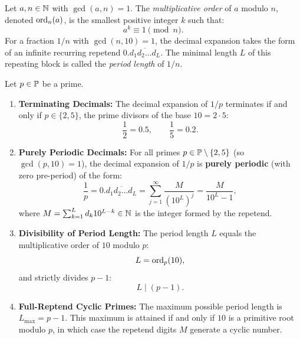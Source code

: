 \begin{definition}
\label{def:ord10}
\leanok
Let $a, n \in \mathbb{N}$ with $\gcd(a, n) = 1$. The \emph{multiplicative order} of $a$ modulo $n$, denoted $\operatorname{ord}_n(a)$, is the smallest positive integer $k$ such that:
\begin{equation}
a^k \equiv 1 \pmod n.
\end{equation}
For a fraction $1/n$ with $\gcd(n, 10) = 1$, the decimal expansion takes the form of an infinite recurring repetend $0.\overline{d_1 d_2 \dots d_L}$. The minimal length $L$ of this repeating block is called the \emph{period length} of $1/n$.
\end{definition}

\begin{theorem}
\label{thm:radix_periodicity}
\leanok
Let $p \in \mathbb{P}$ be a prime.
\begin{enumerate}[label=(\alph*)]
  \item \textbf{Terminating Decimals:} The decimal expansion of $1/p$ terminates if and only if $p \in \{2, 5\}$, the prime divisors of the base $10 = 2 \cdot 5$:
  \begin{equation}
  \frac{1}{2} = 0.5, \qquad \frac{1}{5} = 0.2.
  \end{equation}
  \item \textbf{Purely Periodic Decimals:} For all primes $p \in \mathbb{P} \setminus \{2, 5\}$ (so $\gcd(p, 10) = 1$), the decimal expansion of $1/p$ is \textbf{purely periodic} (with zero pre-period) of the form:
  \begin{equation}
  \label{eq:reptend_form}
  \frac{1}{p} = 0.\overline{d_1 d_2 \dots d_L} = \sum_{j=1}^\infty \frac{M}{(10^L)^j} = \frac{M}{10^L - 1},
  \end{equation}
  where $M = \sum_{k=1}^L d_k 10^{L-k} \in \mathbb{N}$ is the integer formed by the repetend.
  \item \textbf{Divisibility of Period Length:} The period length $L$ equals the multiplicative order of $10$ modulo $p$:
  \begin{equation}
  L = \operatorname{ord}_p(10),
  \end{equation}
  and strictly divides $p - 1$:
  \begin{equation}
  L \mid (p - 1).
  \end{equation}
  \item \textbf{Full-Reptend Cyclic Primes:} The maximum possible period length is $L_{\max} = p - 1$. This maximum is attained if and only if $10$ is a primitive root modulo $p$, in which case the repetend digits $M$ generate a cyclic number.
\end{enumerate}
\end{theorem}

